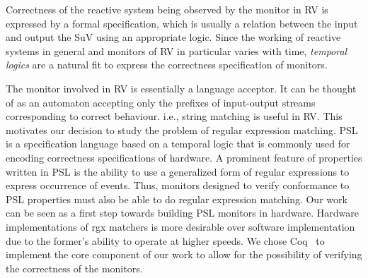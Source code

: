 

Correctness of the reactive system being observed by the monitor in
\gls{RV} is expressed by a formal specification, which is usually a
relation between the input and output the \gls{SuV} using an
appropriate logic.
%
Since the working of reactive systems in general and monitors of
\gls{RV} in particular varies with time, \emph{temporal logics} are a
natural fit to express the correctness specification of monitors.


The monitor involved in \gls{RV} is essentially a language acceptor.
It can be thought of as an automaton accepting only the prefixes of
input-output streams corresponding to correct behaviour.
i.e., string matching is useful in \gls{RV}.
This motivates our decision to study the problem of regular expression
matching.
%
\gls{PSL} is a specification language based on a temporal logic that
is commonly used for encoding correctness specifications of hardware.
A prominent feature of properties written in \gls{PSL} is the ability
to use a generalized form of regular expressions to express occurrence of
events.
Thus, monitors designed to verify conformance to \gls{PSL} properties
must also be able to do regular expression matching.
%
Our work can be seen as a first step towards building \gls{PSL}
monitors in hardware.
Hardware implementations of \gls{rgx} matchers is more desirable over
software implementation due to the former's ability to operate at
higher speeds.
We chose Coq~\cite{cpdt} to implement the core component of our work
to allow for the possibility of verifying the correctness of the
monitors.

